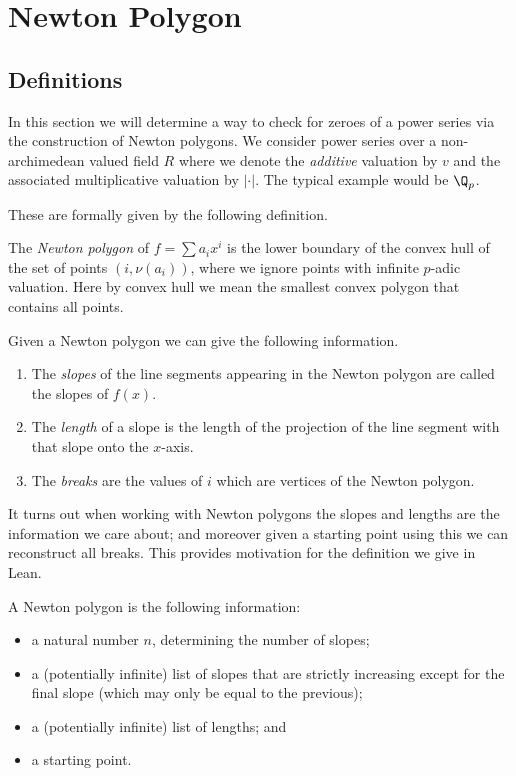 \chapter{Newton Polygon}

\section{Definitions}

In this section we will determine a way to check for zeroes of a power series via the construction
of Newton polygons. We consider power series over a non-archimedean valued field $R$ where we denote
the \emph{additive} valuation by $v$ and the associated multiplicative valuation by $\lvert \cdot \rvert$.
The typical example would be $\Q_p$.

These are formally given by the following definition.

\begin{definition}
    The \emph{Newton polygon} of $f = \sum a_i x^i$ is the lower boundary of the convex hull
    of the set of points $(i,\nu (a_i))$, where we ignore points with infinite $p$-adic valuation.
    Here by convex hull we mean the smallest convex polygon that contains all points.
\end{definition}

Given a Newton polygon we can give the following information.

\begin{definition}
    \begin{enumerate}
        \item The \emph{slopes} of the line segments appearing in the Newton polygon are called the
        slopes of $f(x)$.
        \item The \emph{length} of a slope is the length of the projection of the line segment with
        that slope onto the $x$-axis.
        \item The \emph{breaks} are the values of $i$ which are vertices of the Newton polygon.
    \end{enumerate}
\end{definition}

It turns out when working with Newton polygons the slopes and lengths are the information we care about;
and moreover given a starting point using this we can reconstruct all breaks. This provides motivation
for the definition we give in Lean.

\begin{definition}
  A Newton polygon is the following information:
  \begin{itemize}
    \item a natural number $n$, determining the number of slopes;
    \item a (potentially infinite) list of slopes that are strictly increasing except for the final
      slope (which may only be equal to the previous);
    \item a (potentially infinite) list of lengths; and
    \item a starting point.
  \end{itemize}
\end{definition}


